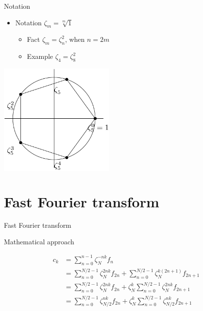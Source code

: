 \begin{frame}{Notation}

\begin{itemize}
\itemsep1pt\parskip0pt
\item
  Notation $\zeta_{m} = \sqrt[m]{1}$

  \begin{itemize}
  \itemsep1pt\parskip0pt
  \item
    Fact $\zeta_{m}=\zeta_{n}^{2}$, when $n = 2m$
  \item
    Example $\zeta_{4}=\zeta_{8}^{2}$
  \end{itemize}
\end{itemize}

\centerline{\includegraphics[width=2.25in]{bbb.png}}

\end{frame}

\section{Fast Fourier transform}\label{fast-fourier-transform}

\begin{frame}{Fast Fourier transform}

\begin{block}{Mathematical approach}

\begin{align*}
 c_{k}& =  \sum_{n=0}^{n-1} \zeta_{N}^{-nk}f_{n} \\
  & =  \sum_{n=0}^{N/2-1} \zeta_{N}^{2nk}f_{2n} + \sum_{n=0}^{N/2-1} \zeta_{N}^{k(2n+1)} f_{2n+1} \\
 & =  \sum_{n=0}^{N/2-1} \zeta_{N}^{2nk}f_{2n} + \zeta_{N}^{k}\sum_{n=0}^{N/2-1} \zeta_{N}^{2nk} f_{2n+1} \\
& = \sum_{n=0}^{N/2-1} \zeta_{N/2}^{nk}f_{2n} + \zeta_{N}^{k}\sum_{n=0}^{N/2-1} \zeta_{N/2}^{nk} f_{2n+1}
\end{align*}

\end{block}

\end{frame}

